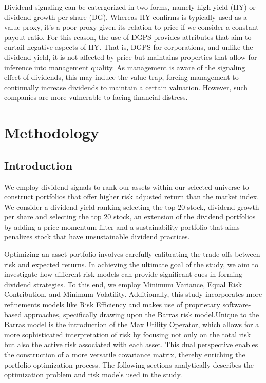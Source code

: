 \documentclass[12pt,preprint, authoryear]{elsarticle}
\numberwithin{equation}{section}
\numberwithin{figure}{section}
\numberwithin{table}{section}
\begin{document}
Dividend signaling can be catergorized in two forms, namely high yield
(HY) or dividend growth per share (DG). Whereas HY confirms is typically
used as a value proxy, it's a poor proxy given its relation to price if
we consider a constant payout ratio. For this reason, the use of DGPS
provides attributes that aim to curtail negative aspects of HY. That is,
DGPS for corporations, and unlike the dividend yield, it is not affected
by price but maintains properties that allow for inference into
management quality. As management is aware of the signaling effect of
dividends, this may induce the value trap, forcing management to
continually increase dividends to maintain a certain valuation. However,
such companies are more vulnerable to facing financial distress.

\newpage

\hypertarget{methodology}{%
\section{Methodology}\label{methodology}}

\hypertarget{introduction-1}{%
\subsection{Introduction}\label{introduction-1}}

We employ dividend signals to rank our assets within our selected
universe to construct portfolios that offer higher risk adjusted return
than the market index. We consider a dividend yield ranking selecting
the top 20 stock, dividend growth per share and selecting the top 20
stock, an extension of the dividend portfolios by adding a price
momentum filter and a sustainability portfolio that aims penalizes stock
that have unsustainable dividend practices.

Optimizing an asset portfolio involves carefully calibrating the
trade-offs between risk and expected returns. In achieving the ultimate
goal of the study, we aim to investigate how different risk models can
provide significant cues in forming dividend strategies. To this end, we
employ Minimum Variance, Equal Risk Contribution, and Minimum
Volatility. Additionally, this study incorporates more refinements
models like Risk Efficiency and makes use of proprietary software-based
approaches, specifically drawing upon the Barras risk model.Unique to
the Barras model is the introduction of the Max Utility Operator, which
allows for a more sophisticated interpretation of risk by focusing not
only on the total risk but also the active risk associated with each
asset. This dual perspective enables the construction of a more
versatile covariance matrix, thereby enriching the portfolio
optimization process. The following sections analytically describes the
optimization problem and risk models used in the study.
\end{document}
